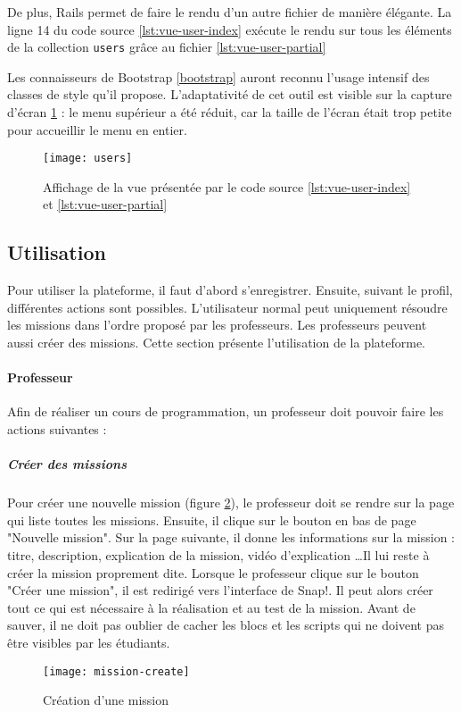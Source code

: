 \begin{figure}

\end{figure}
De plus, Rails permet de faire le rendu d'un autre fichier de manière élégante. La ligne 14 du code source \ref{lst:vue-user-index} exécute le rendu sur tous les éléments de la collection \texttt{users} grâce au fichier \ref{lst:vue-user-partial}

Les connaisseurs de Bootstrap \ref{bootstrap} auront reconnu l'usage intensif des classes de style qu'il propose. L'adaptativité de cet outil est visible sur la capture d'écran \ref{fig:vue-users} : le menu supérieur a été réduit, car la taille de l'écran était trop petite pour accueillir le menu en entier.

\begin{figure}
  \begin{center}
    \texttt{[image: users]}
    \caption{Affichage de la vue présentée par le code source \ref{lst:vue-user-index} et \ref{lst:vue-user-partial}}
    \label{fig:vue-users}
  \end{center}
\end{figure}

\subsection{Utilisation}
Pour utiliser la plateforme, il faut d'abord s'enregistrer. Ensuite, suivant le profil, différentes actions sont possibles. L'utilisateur normal peut uniquement résoudre les missions dans l'ordre proposé par les professeurs. Les professeurs peuvent aussi créer des missions. Cette section présente l'utilisation de la plateforme.

\paragraph{Professeur}
Afin de réaliser un cours de programmation, un professeur doit pouvoir faire les actions suivantes :
\subparagraph{Créer des missions} Pour créer une nouvelle mission (figure \ref{fig:mission-create}), le professeur doit se rendre sur la page qui liste toutes les missions. Ensuite, il clique sur le bouton en bas de page "Nouvelle mission". Sur la page suivante, il donne les informations sur la mission : titre, description, explication de la mission, vidéo d'explication \ldots Il lui reste à créer la mission proprement dite. Lorsque le professeur clique sur le bouton "Créer une mission", il est redirigé vers l'interface de Snap!. Il peut alors créer tout ce qui est nécessaire à la réalisation et au test de la mission. Avant de sauver, il ne doit pas oublier de cacher les blocs et les scripts qui ne doivent pas être visibles par les étudiants.
\begin{figure}
  \begin{center}
    \texttt{[image: mission-create]}
    \caption{Création d'une mission}
    \label{fig:mission-create}
  \end{center}
\end{figure}

